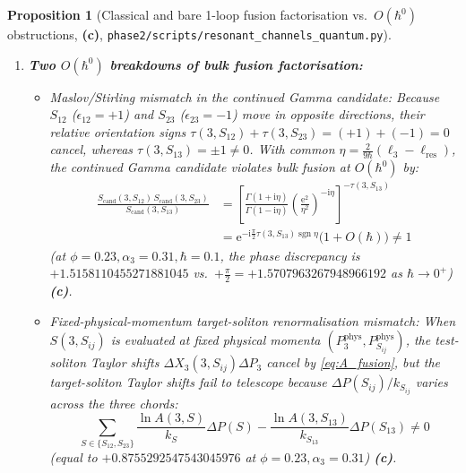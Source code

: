 \documentclass[11pt,a4paper]{article}
\newcommand{\Lc}{\textsf{\textbf{(c)}}\xspace}
\newcommand{\ii}{\mathrm{i}}
\newcommand{\ee}{\mathrm{e}}
\newcommand{\hb}{\hbar}
\newcommand{\sgn}{\operatorname{sgn}}
\newcommand{\squant}{\texttt{phase2/\allowbreak scripts/\allowbreak resonant\_\allowbreak channels\_\allowbreak quantum.py}}
\newtheorem{proposition}{Proposition}[section]
\theoremstyle{remark}
\begin{document}
\begin{proposition}[Classical and bare 1-loop fusion factorisation vs.\ $O(\hb^0)$ obstructions, \Lc, \squant]
\begin{enumerate}
\item \textbf{Two $O(\hb^0)$ breakdowns of bulk fusion factorisation:}
\begin{itemize}
\item \emph{Maslov/Stirling mismatch in the continued Gamma candidate:}
Because $S_{12}$ ($\epsilon_{12}=+1$) and $S_{23}$ ($\epsilon_{23}=-1$) move in
opposite directions, their relative orientation signs $\tau(3,S_{12})+\tau(3,S_{23}) = (+1)+(-1) = 0$
cancel, whereas $\tau(3,S_{13}) = \pm 1 \ne 0$. With common
$\eta = \frac{2}{9\hb}(\ell_3-\ell_{\mathrm{res}})$, the continued Gamma candidate
violates bulk fusion at $O(\hb^0)$ by:
\begin{align}\label{eq:gamma_fusion_fail}
  \frac{S_{\mathrm{cand}}(3,S_{12})\,S_{\mathrm{cand}}(3,S_{23})}{S_{\mathrm{cand}}(3,S_{13})}
  &= \left[\frac{\Gamma(1+\ii\eta)}{\Gamma(1-\ii\eta)}\!\left(\frac{\ee^2}{\eta^2}\right)^{-\ii\eta}\right]^{-\tau(3,S_{13})} \nonumber\\
  &= \ee^{-\ii\frac{\pi}{2}\tau(3,S_{13})\sgn\eta}\big(1 + O(\hb)\big) \ne 1
\end{align}
(at $\phi=0.23,\alpha_3=0.31,\hb=0.1$, the phase discrepancy is
$+1.5158110455271881045$ vs.\ $+\frac{\pi}{2} = +1.5707963267948966192$ as
$\hb\to 0^+$) \Lc.
\item \emph{Fixed-physical-momentum target-soliton renormalisation mismatch:}
When $S(3,S_{ij})$ is evaluated at fixed physical momenta
$(P_3^{\mathrm{phys}},P_{S_{ij}}^{\mathrm{phys}})$, the test-soliton Taylor shifts
$\Delta X_3(3,S_{ij})\Delta P_3$ cancel by \eqref{eq:A_fusion}, but the
target-soliton Taylor shifts fail to telescope because $\Delta P(S_{ij})/k_{S_{ij}}$
varies across the three chords:
\begin{equation}\label{eq:target_P_mismatch}
  \sum_{S\in\{S_{12},S_{23}\}} \frac{\ln A(3,S)}{k_S}\Delta P(S)
  - \frac{\ln A(3,S_{13})}{k_{S_{13}}}\Delta P(S_{13}) \ne 0
\end{equation}
(equal to $+0.8755292547543045976$ at $\phi=0.23,\alpha_3=0.31$) \Lc.
\end{itemize}
\end{enumerate}
\end{proposition}
\end{document}
